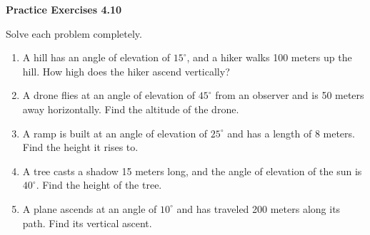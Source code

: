 \vspace{0.3ex}
\noindent\textbf{Practice Exercises 4.10}

\vspace{0.2ex}

Solve each problem completely.

\begin{enumerate}
    \item A hill has an angle of elevation of \(15^\circ\), and a hiker walks 100 meters up the hill. How high does the hiker ascend vertically?
    \item A drone flies at an angle of elevation of \(45^\circ\) from an observer and is 50 meters away horizontally. Find the altitude of the drone.
    \item A ramp is built at an angle of elevation of \(25^\circ\) and has a length of 8 meters. Find the height it rises to.
    \item A tree casts a shadow 15 meters long, and the angle of elevation of the sun is \(40^\circ\). Find the height of the tree.
    \item A plane ascends at an angle of \(10^\circ\) and has traveled 200 meters along its path. Find its vertical ascent.
\end{enumerate}
